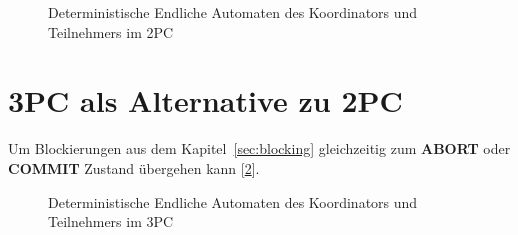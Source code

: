 \documentclass[11pt]{scrartcl}       %
\begin{document}
\begin{figure}[!tbp]
	\centering
	\hfill
	\caption{Deterministische Endliche Automaten des Koordinators und Teilnehmers im 2PC}
	\label{fig:participant2pc-label}
\end{figure}

\section{3PC als Alternative zu 2PC}\label{sec:kapitel4}
Um Blockierungen aus dem Kapitel~\ref{sec:blocking}
gleichzeitig zum \textbf{ABORT} oder \textbf{COMMIT} 
Zustand übergehen kann [\ref{fig:participant3pc-label}].

\begin{figure}[!tbp]
	\centering
	\hfill
	\caption{Deterministische Endliche Automaten des Koordinators und Teilnehmers im 3PC}
	\label{fig:participant3pc-label}
\end{figure}
\end{document}
